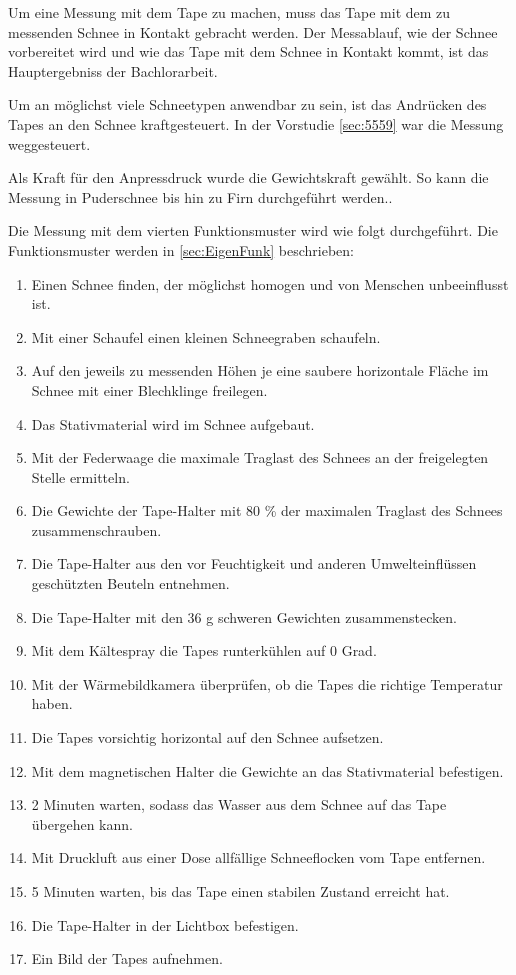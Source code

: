 Um eine Messung mit dem Tape zu machen, muss das Tape mit dem zu messenden Schnee in Kontakt gebracht werden. Der Messablauf, wie der Schnee vorbereitet wird und wie das Tape mit dem Schnee in Kontakt kommt, ist das Hauptergebniss der Bachlorarbeit.

Um an möglichst viele Schneetypen anwendbar zu sein, ist das Andrücken des Tapes an den Schnee kraftgesteuert. In der Vorstudie \ref{sec:5559} war die Messung weggesteuert.

Als Kraft für den Anpressdruck wurde die Gewichtskraft gewählt. So kann die Messung in Puderschnee bis hin zu Firn durchgeführt werden..

Die Messung mit dem vierten Funktionsmuster wird wie folgt durchgeführt. Die Funktionsmuster werden in \ref{sec:EigenFunk} beschrieben:

\begin{enumerate}
\item Einen Schnee finden, der möglichst homogen und von Menschen unbeeinflusst ist.
\item Mit einer Schaufel einen kleinen Schneegraben schaufeln.
\item Auf den jeweils zu messenden Höhen je eine saubere horizontale Fläche im Schnee mit einer Blechklinge freilegen.
\item Das Stativmaterial wird im Schnee aufgebaut.
\item Mit der Federwaage die maximale Traglast des Schnees an der freigelegten Stelle ermitteln.
\item Die Gewichte der Tape-Halter mit 80 \% der maximalen Traglast des Schnees zusammenschrauben.
\item Die Tape-Halter aus den vor Feuchtigkeit und anderen Umwelteinflüssen geschützten Beuteln entnehmen.
\item Die Tape-Halter mit den 36 g schweren Gewichten zusammenstecken.
\item Mit dem Kältespray die Tapes runterkühlen auf 0 Grad.
\item Mit der Wärmebildkamera überprüfen, ob die Tapes die richtige Temperatur haben.
\item Die Tapes vorsichtig horizontal auf den Schnee aufsetzen.
\item Mit dem magnetischen Halter die Gewichte an das Stativmaterial befestigen.
\item 2 Minuten warten, sodass das Wasser aus dem Schnee auf das Tape übergehen kann.
\item Mit Druckluft aus einer Dose allfällige Schneeflocken vom Tape entfernen.
\item 5 Minuten warten, bis das Tape einen stabilen Zustand erreicht hat.
\item Die Tape-Halter in der Lichtbox befestigen.
\item Ein Bild der Tapes aufnehmen.
\end{enumerate}
